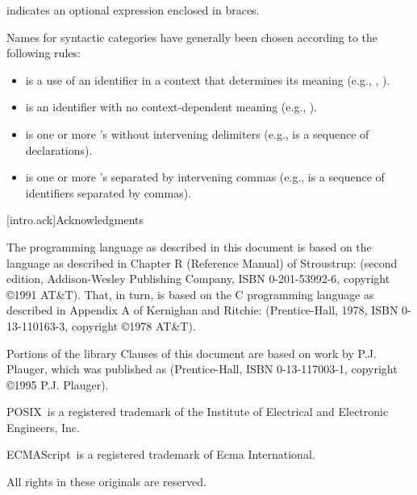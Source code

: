 indicates an optional expression enclosed in braces.%

\pnum
Names for syntactic categories have generally been chosen according to
the following rules:
\begin{itemize}
\item {} is a use of an identifier in a context that
determines its meaning (e.g., ,
).
\item {} is an identifier with no context-dependent meaning
(e.g., ).
\item {} is one or more 's without intervening
delimiters (e.g.,  is a sequence of
declarations).
\item {} is one or more 's separated by
intervening commas (e.g.,  is a sequence of
identifiers separated by commas).
\end{itemize}%

[intro.ack]{Acknowledgments}

\pnum
The \Cpp{}  programming language as described in this document
is based on the language as described in Chapter R (Reference
Manual) of Stroustrup:  (second
edition, Addison-Wesley Publishing Company, ISBN 0-201-53992-6,
copyright \copyright 1991 AT\&T). That, in turn, is based on the C
programming language as described in Appendix A of Kernighan and
Ritchie:  (Prentice-Hall, 1978, ISBN
0-13-110163-3, copyright \copyright 1978 AT\&T).

\pnum
Portions of the library Clauses of this document are based
on work by P.J. Plauger, which was published as  (Prentice-Hall, ISBN 0-13-117003-1, copyright
\copyright 1995 P.J. Plauger).

\pnum
POSIX\textregistered\ is a registered trademark of the Institute of Electrical and
Electronic Engineers, Inc.

\pnum
ECMAScript\textregistered\ is a registered trademark of Ecma International.

\pnum
All rights in these originals are reserved.
